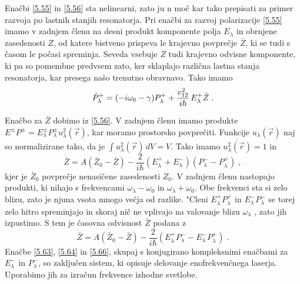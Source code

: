 Enačbi \ref{5.55} in \ref{5.56} sta nelinearni, zato ju n moč kar tako
prepisati za primer razvoja po lastnih stanjih resonatorja. Pri enačbi za
razvoj polarizacije \ref{5.55} imamo v zadnjem členu na desni produkt
komponente polja $E_{\lambda}$ in obrnjene zasedenosti $Z$, od katere
bistveno prispeva le krajevno povprečje $\bar{Z}$, ki se tudi s časom le
počasi spreminja. Seveda vsebuje $Z$ tudi krajevno odvisne komponente, ki
pa so pomembne predvsem zato, ker sklaplajo različna lastna stanja
resonatorja, kar presega našo trenutno obravnavo. Tako imamo 
\begin{equation}  \label{5.64}
\dot{P}_{\lambda}^+=(-i \omega_0- \gamma)P_{\lambda}^++\frac{v_{12}^2} {%
i\hbar}\,E_{\lambda}^+\bar{Z}\;.
\end{equation}

Enačbo za $\bar{Z}$ dobimo iz \ref{5.56}. V zadnjem členu imamo produkte $%
E^{\pm}P^{\pm}=E_{\lambda}^{\pm}P_{\lambda}^{\pm} u_{\lambda}^2(\vec{r})$,
kar moramo prostorsko povprečiti. Funkcije $u_{\lambda}(\vec{r})$ naj so
normalizirane tako, da je $\int u_{\lambda}^2(\vec{r}) \,dV=V$. Tako imamo $%
\overline{u_{\lambda}^2(\vec{r})}=1$ in 
\begin{equation}  \label{5.65}
\dot{\bar{Z}}= A(\bar{Z}_0-\bar{Z})- \frac{2}{i\hbar}(E_{\lambda}^++
E_{\lambda}^-)(P_{\lambda}^- - P_{\lambda}^+)\;,
\end{equation}
kjer je $\bar{Z}_0$ povprečje nenasičene zasedenosti $Z_0$. V zadnjem
členu nastopajo produkti, ki nihajo s frekvencami $\omega_{\lambda}-
\omega_0$ in $\omega_{\lambda}+ \omega_0$. Obe frekvenci sta si zelo blizu,
zato je njuna vsota mnogo večja od razlike. "Cleni $E_{\lambda}^+
P_{\lambda}^+$ in $E_{\lambda}^- P_{\lambda}^-$ se torej zelo hitro
spreminjajo in skoraj nič ne vplivajo na valovanje blizu $\omega_{\lambda}$%
, zato jih izpustimo. S tem je časovna odvisnost $\bar{Z}$ podana z 
\begin{equation}  \label{5.66}
\dot{\bar{Z}}= A(\bar{Z}_0-\bar{Z})- \frac{2}{i\hbar}(E_{\lambda}^+
P_{\lambda}^- - E_{\lambda}^- P_{\lambda}^+)\;.
\end{equation}
Enačbe \ref{5.63}, \ref{5.64} in \ref{5.66}, skupaj s konjugirano
kompleksnimi enačbami za $E_{\lambda}^-$ in $P_{\lambda}^-$, so zaključen
sistem, ki opisuje delovanje enofrekvenčnega laserja. Uporabimo jih za
izračun frekvence izhodne svetlobe.

